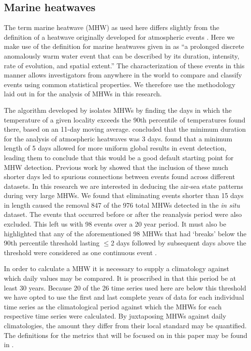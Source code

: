 \documentclass[a4paper,10pt,review]{elsarticle}
\begin{document}
\subsection{Marine heatwaves}
The term marine heatwave (MHW) as used here differs slightly from the definition of a heatwave originally developed for atmospheric events \citep{Perkins2013}. Here we make use of the definition for marine heatwaves given in \citet{Hobday2016} as ``a prolonged discrete anomalously warm water event that can be described by its duration, intensity, rate of evolution, and spatial extent.'' The characterization of these events in this manner allows investigators from anywhere in the world to compare and classify events using common statistical properties. We therefore use the methodology laid out in \citet{Hobday2016} for the analysis of MHWs in this research.

The algorithm developed by \citet{Hobday2016} isolates MHWs by finding the days in which the temperature of a given locality exceeds the 90th percentile of temperatures found there, based on an 11-day moving average. \citet{Perkins2013} concluded that the minimum duration for the analysis of atmospheric heatwaves was 3 days. \citet{Hobday2016} found that a minimum length of 5 days allowed for more uniform global results in event detection, leading them to conclude that this would be a good default starting point for MHW detection. Previous work by \citet{Schlegel2016} showed that the inclusion of these much shorter days led to spurious connections between events found across different datasets. In this research we are interested in deducing the air-sea state patterns during very large MHWs. We found that eliminating events shorter than 15 days in length caused the removal 847 of the 976 total MHWs detected in the \emph{in situ} dataset. The events that occurred before or after the reanalysis period were also excluded. This left us with 98 events over a 20 year period. It must also be highlighted that any of the aforementioned 98 MHWs that had `breaks' below the 90th percentile threshold lasting $\leq$2 days followed by subsequent days above the threshold were considered as one continuous event \citep{Hobday2016}.

In order to calculate a MHW it is necessary to supply a climatology against which daily values may be compared. It is proscribed in \citet{Hobday2016} that this period be at least 30 years. Because 20 of the 26 time series used here are below this threshold we have opted to use the first and last complete years of data for each individual time series as the climatological period against which the MHWs for each respective time series were calculated. By juxtaposing MHWs against daily climatologies, the amount they differ from their local standard may be quantified. The definitions for the metrics that will be focused on in this paper may be found in .
\end{document}
